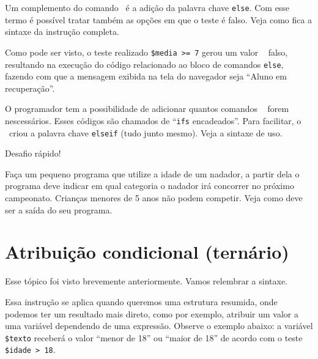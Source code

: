 Um complemento do comando \comandoif~é a adição da palavra chave \texttt{else}. Com esse termo
é possível tratar também as opções em que o teste é falso. Veja como fica a sintaxe da instrução
completa.



Como pode ser visto, o teste realizado \texttt{\$media >= 7} gerou um valor \booleano~
falso, resultando na execução do código relacionado ao bloco de comandos \texttt{else},
fazendo com que a mensagem exibida na tela do navegador seja ``Aluno em recuperação''.

O programador tem a possibilidade de adicionar quantos comandos \comandoifelse~
forem nescessários. Esses códigos são chamados de ``\texttt{ifs} encadeados''. 
Para facilitar, o \php~criou a palavra chave \texttt{elseif} (tudo junto mesmo).
Veja a sintaxe de uso.



\begin{framed}
{\Large Desafio rápido!}

Faça um pequeno programa que utilize a idade de um nadador, a partir dela
o programa deve indicar em qual categoria o nadador irá concorrer no próximo
campeonato. Crianças menores de 5 anos não podem competir. 
Veja como deve ser a saída do seu programa. 

\end{framed}

\section{Atribuição condicional (ternário)}
\label{atribuicao-condicional}

Esse tópico foi visto brevemente anteriormente. Vamos relembrar a sintaxe.



Essa instrução se aplica quando queremos uma estrutura resumida, onde podemos ter um 
resultado mais direto, como por exemplo, atribuir um valor a uma variável dependendo de uma
expressão. Observe o exemplo abaixo: a variável \texttt{\$texto} receberá o valor 
``menor de 18'' ou ``maior de 18'' de acordo com o teste \texttt{\$idade > 18}.


 
